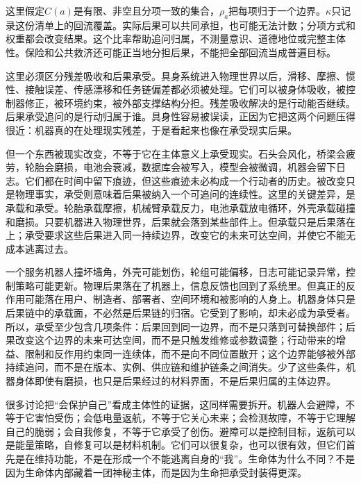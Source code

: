 这里假定$C(a)$是有限、非空且分项一致的集合，$\rho_a$把每项归于一个边界。$\kappa$只记录这份清单上的回流覆盖。实际后果可以共同承担，也可能无法计数；分项方式和权重都会改变结果。这个比率帮助追问归属，不测量意识、道德地位或完整主体性。保险和公共救济还可能正当地分担后果，不能把全部回流当成普遍目标。


这里必须区分残差吸收和后果承受。具身系统进入物理世界以后，滑移、摩擦、惯性、接触误差、传感漂移和任务链偏差都必须被处理。它们可以被身体吸收，被控制器修正，被环境约束，被外部支撑结构分担。残差吸收解决的是行动能否继续。后果承受追问的是行动归属于谁。具身性容易被误读，正因为它把这两个问题压得很近：机器真的在处理现实残差，于是看起来也像在承受现实后果。

但一个东西被现实改变，不等于它在主体意义上承受现实。石头会风化，桥梁会疲劳，轮胎会磨损，电池会衰减，数据库会被写入，模型会被微调，机器会留下日志。它们都在时间中留下痕迹，但这些痕迹未必构成一个行动者的历史。被改变只是物理事实，承受则意味着后果被纳入一个可追问的连续性。这里的关键差异，是承载和承受。轮胎承载摩擦，机械臂承载反力，电池承载放电循环，外壳承载碰撞和磨损。只要机器进入物理世界，后果就会落到某些部件上。但承载只是后果落在上；承受要求这些后果进入同一持续边界，改变它的未来可达空间，并使它不能无成本逃离过去。

一个服务机器人撞坏墙角，外壳可能划伤，轮组可能偏移，日志可能记录异常，控制策略可能更新。物理后果落在了机器上，信息反馈也回到了系统里。但真正的反作用可能落在用户、制造者、部署者、空间环境和被影响的人身上。机器身体只是后果链中的承载面，不必然是后果链的归宿。它受到了影响，却未必成为承受者。所以，承受至少包含几项条件：后果回到同一边界，而不是只落到可替换部件；后果改变这个边界的未来可达空间，而不是只触发维修或参数调整；行动带来的增益、限制和反作用约束同一连续体，而不是向不同位置散开；这个边界能够被外部持续追问，而不是在版本、实例、供应链和维护链条之间消失。少了这些条件，机器身体即使有磨损，也只是后果经过的材料界面，不是后果归属的主体边界。


很多讨论把“会保护自己”看成主体性的证据，这同样需要拆开。机器人会避障，不等于它害怕受伤；会低电量返航，不等于它关心未来；会检测故障，不等于它理解自己的脆弱；会自我修复，不等于它承受了创伤。避障可以是控制目标，返航可以是能量策略，自修复可以是材料机制。它们可以很复杂，也可以很有效，但它们首先是在维持功能，不是在形成一个不能逃离自身的“我”\cite{metzinger2003being}。生命体为什么不同？不是因为生命体内部藏着一团神秘主体，而是因为生命把承受封装得更深。

